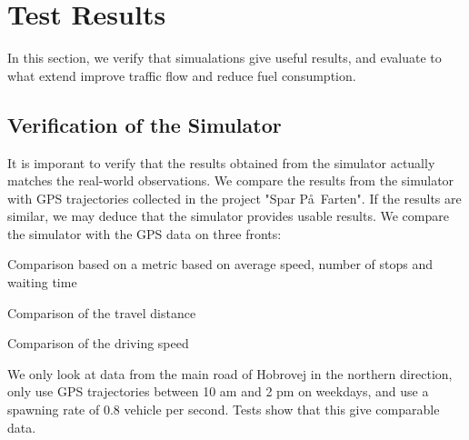 \section{Test Results}\label{sec:Test}
In this section, we verify that simualations give useful results, and evaluate to what extend \tech improve traffic flow and reduce fuel consumption.

\subsection{Verification of the Simulator}
It is imporant to verify that the results obtained from the simulator actually matches the real-world observations.
We compare the results from the simulator with GPS trajectories collected in the project "Spar P\aa\ Farten".
If the results are similar, we may deduce that the simulator provides usable results.
We compare the simulator with the GPS data on three fronts: 
\begin{enumerate*}
\item Comparison based on a metric based on average speed, number of stops and waiting time
\item Comparison of the travel distance 
\item Comparison of the driving speed
\end{enumerate*}

We only look at data from the main road of Hobrovej in the northern direction, only use GPS trajectories between 10 am and 2 pm on weekdays, and use a spawning rate of $0.8$ vehicle per second.
Tests show that this give comparable data.

